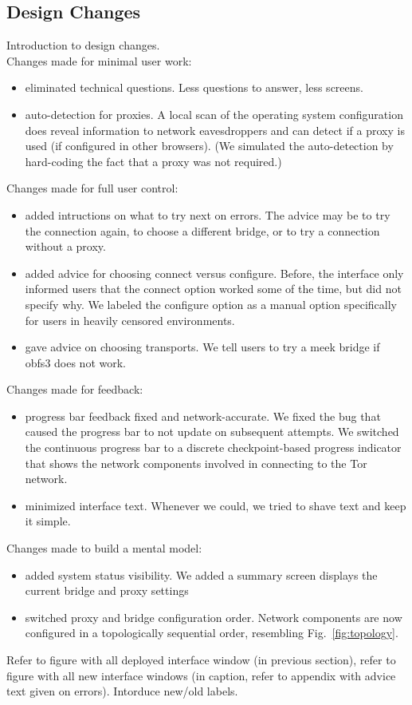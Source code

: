 \documentclass[USenglish,oneside,twocolumn]{article}
\begin{document}
\subsection{Design Changes} 
{\color {blue}
Introduction to design changes.  \\

\noindent Changes made for minimal user work: 
\begin{itemize}
\item eliminated technical questions. Less questions to answer, less screens. 
\item auto-detection for proxies. A local scan of the operating system configuration does reveal information to network eavesdroppers and can detect if a proxy is used (if configured in other browsers). (We simulated the auto-detection by hard-coding the fact that a proxy was not required.)
\end{itemize} 

Changes made for full user control: 
\begin{itemize}
\item added intructions on what to try next on errors. The advice may be to try the connection again, to choose a different bridge, or to try a connection without a proxy. 
\item added advice for choosing connect versus configure. Before, the interface only informed users that the connect option worked some of the time, but did not specify why. We labeled the configure option as a manual option  specifically for users in heavily censored environments.
\item gave advice on choosing transports. We tell users to try a meek bridge if obfs3 does not work.
\end{itemize}

Changes made for feedback: 
\begin{itemize}
\item progress bar feedback fixed and network-accurate. We fixed the bug that caused the progress bar to not update on subsequent attempts. We switched the continuous progress bar to a discrete checkpoint-based progress indicator that shows the network components involved in connecting to the Tor network. 
\item minimized interface text. Whenever we could, we tried to shave text and keep it simple. 
\end{itemize}

Changes made to build a mental model:
\begin{itemize}
\item added system status visibility. We added a summary screen displays the current bridge and proxy settings
\item switched proxy and bridge configuration order. Network components are now configured in a topologically sequential order, resembling Fig.~\ref{fig:topology}.
\end{itemize}

Refer to figure with all deployed interface window (in previous section), refer to figure with all new interface windows (in caption, refer to appendix with advice text given on errors). Intorduce new/old labels. 
}
\end{document}
